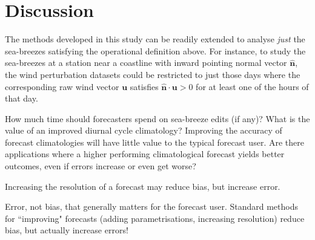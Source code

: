 \documentclass[alpha-refs]{wiley-article}
\begin{document}
\section{Discussion}
\label{Sec:Discussion}
The methods developed in this study can be readily extended to analyse \emph{just} the sea-breezes satisfying the operational definition above. For instance, to study the sea-breezes at a station near a coastline with inward pointing normal vector $\widehat{\boldsymbol{n}}$, the wind perturbation datasets could be restricted to just those days where the corresponding raw wind vector $\boldsymbol{u}$ satisfies $\widehat{\boldsymbol{n}} \cdot \boldsymbol{u} > 0$ for at least one of the hours of that day.

How much time should forecasters spend on sea-breeze edits (if any)? What is the value of an improved diurnal cycle climatology? Improving the accuracy of forecast climatologies will have little value to the typical forecast user. Are there applications where a higher performing climatological forecast yields better outcomes, even if errors increase or even get worse? 

Increasing the resolution of a forecast may reduce bias, but increase error.

Error, not bias, that generally matters for the forecast user. Standard methods for ``improving" forecasts (adding parametrisations, increasing resolution) reduce bias, but actually increase errors! 
\end{document}
